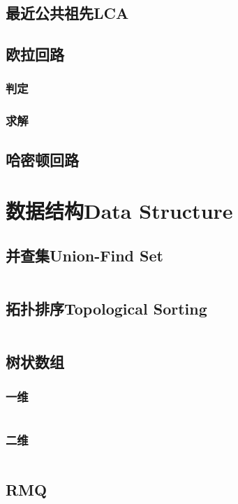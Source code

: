 \documentclass[twoside,sub3section,UTF8]{ctexart}						%
\begin{document}
	\subsection{最近公共祖先LCA}


	\subsection{欧拉回路}
		\subsubsection{判定}
		\subsubsection{求解}

	\subsection{哈密顿回路}


\newpage
\section{数据结构Data Structure}
	\subsection{并查集Union-Find Set}
	\inputminted{c++}{Data Structure/union-find-set.cpp}
	\subsection{拓扑排序Topological Sorting}
	\inputminted{c++}{Data Structure/topo.cpp}
	\subsection{树状数组}
		\subsubsection{一维}
		\inputminted{c++}{Data Structure/szsz.cpp}
		\subsubsection{二维}
		\inputminted{c++}{Data Structure/2Dszsz.cpp}
	\subsection{RMQ}
\end{document}
